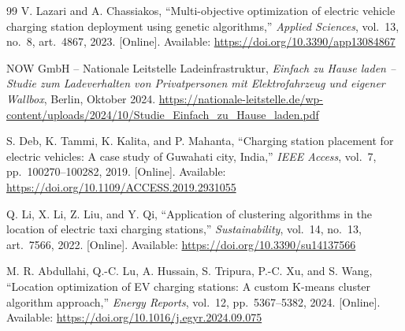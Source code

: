 \begin{thebibliography}{99}
    V. Lazari and A. Chassiakos,
    ``Multi-objective optimization of electric vehicle charging station deployment using genetic algorithms,''
    \textit{Applied Sciences}, vol.~13, no.~8, art.~4867, 2023. [Online]. Available:
    \url{https://doi.org/10.3390/app13084867}

    NOW GmbH -- Nationale Leitstelle Ladeinfrastruktur,
    \textit{Einfach zu Hause laden -- Studie zum Ladeverhalten von Privatpersonen mit Elektrofahrzeug und eigener Wallbox},
    Berlin, Oktober 2024.
    \url{https://nationale-leitstelle.de/wp-content/uploads/2024/10/Studie_Einfach_zu_Hause_laden.pdf}

    S. Deb, K. Tammi, K. Kalita, and P. Mahanta,
    ``Charging station placement for electric vehicles: A case study of Guwahati city, India,''
    \textit{IEEE Access}, vol.~7, pp.~100270--100282, 2019. [Online]. Available:
    \url{https://doi.org/10.1109/ACCESS.2019.2931055}

    Q. Li, X. Li, Z. Liu, and Y. Qi,
    ``Application of clustering algorithms in the location of electric taxi charging stations,''
    \textit{Sustainability}, vol.~14, no.~13, art.~7566, 2022. [Online]. Available:
    \url{https://doi.org/10.3390/su14137566}

    M. R. Abdullahi, Q.-C. Lu, A. Hussain, S. Tripura, P.-C. Xu, and S. Wang,
    ``Location optimization of EV charging stations: A custom K-means cluster algorithm approach,''
    \textit{Energy Reports}, vol.~12, pp.~5367--5382, 2024. [Online]. Available:
    \url{https://doi.org/10.1016/j.egyr.2024.09.075}

\end{thebibliography}
